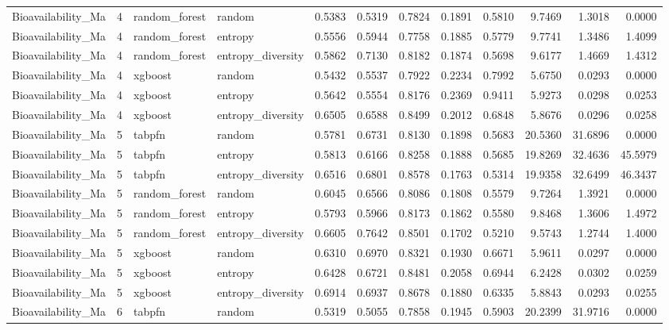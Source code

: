 \begin{tabular}{lrllrrrrrrrr}
Bioavailability_Ma & 4 & random_forest & random & 0.5383 & 0.5319 & 0.7824 & 0.1891 & 0.5810 & 9.7469 & 1.3018 & 0.0000 \\
Bioavailability_Ma & 4 & random_forest & entropy & 0.5556 & 0.5944 & 0.7758 & 0.1885 & 0.5779 & 9.7741 & 1.3486 & 1.4099 \\
Bioavailability_Ma & 4 & random_forest & entropy_diversity & 0.5862 & 0.7130 & 0.8182 & 0.1874 & 0.5698 & 9.6177 & 1.4669 & 1.4312 \\
Bioavailability_Ma & 4 & xgboost & random & 0.5432 & 0.5537 & 0.7922 & 0.2234 & 0.7992 & 5.6750 & 0.0293 & 0.0000 \\
Bioavailability_Ma & 4 & xgboost & entropy & 0.5642 & 0.5554 & 0.8176 & 0.2369 & 0.9411 & 5.9273 & 0.0298 & 0.0253 \\
Bioavailability_Ma & 4 & xgboost & entropy_diversity & 0.6505 & 0.6588 & 0.8499 & 0.2012 & 0.6848 & 5.8676 & 0.0296 & 0.0258 \\
Bioavailability_Ma & 5 & tabpfn & random & 0.5781 & 0.6731 & 0.8130 & 0.1898 & 0.5683 & 20.5360 & 31.6896 & 0.0000 \\
Bioavailability_Ma & 5 & tabpfn & entropy & 0.5813 & 0.6166 & 0.8258 & 0.1888 & 0.5685 & 19.8269 & 32.4636 & 45.5979 \\
Bioavailability_Ma & 5 & tabpfn & entropy_diversity & 0.6516 & 0.6801 & 0.8578 & 0.1763 & 0.5314 & 19.9358 & 32.6499 & 46.3437 \\
Bioavailability_Ma & 5 & random_forest & random & 0.6045 & 0.6566 & 0.8086 & 0.1808 & 0.5579 & 9.7264 & 1.3921 & 0.0000 \\
Bioavailability_Ma & 5 & random_forest & entropy & 0.5793 & 0.5966 & 0.8173 & 0.1862 & 0.5580 & 9.8468 & 1.3606 & 1.4972 \\
Bioavailability_Ma & 5 & random_forest & entropy_diversity & 0.6605 & 0.7642 & 0.8501 & 0.1702 & 0.5210 & 9.5743 & 1.2744 & 1.4000 \\
Bioavailability_Ma & 5 & xgboost & random & 0.6310 & 0.6970 & 0.8321 & 0.1930 & 0.6671 & 5.9611 & 0.0297 & 0.0000 \\
Bioavailability_Ma & 5 & xgboost & entropy & 0.6428 & 0.6721 & 0.8481 & 0.2058 & 0.6944 & 6.2428 & 0.0302 & 0.0259 \\
Bioavailability_Ma & 5 & xgboost & entropy_diversity & 0.6914 & 0.6937 & 0.8678 & 0.1880 & 0.6335 & 5.8843 & 0.0293 & 0.0255 \\
Bioavailability_Ma & 6 & tabpfn & random & 0.5319 & 0.5055 & 0.7858 & 0.1945 & 0.5903 & 20.2399 & 31.9716 & 0.0000 \\

\end{tabular}
